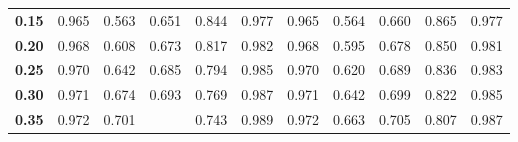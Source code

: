 \begin{table}
\begin{small}
\begin{tabular}{l|l|l|l|l|l|l|l|l|l|l}
    \cellcolor[HTML]{EFEFEF}\textbf{0.15}   & \cellcolor[HTML]{FFEEEE}0.965                 & \cellcolor[HTML]{FFEEEE}0.563               & \cellcolor[HTML]{FFEEEE}0.651                     & \cellcolor[HTML]{FFEEEE}0.844                    & \cellcolor[HTML]{FFEEEE}0.977                 & \cellcolor[HTML]{EEFFEE}0.965                 & \cellcolor[HTML]{EEFFEE}0.564               & \cellcolor[HTML]{EEFFEE}0.660                    & \cellcolor[HTML]{EEFFEE}0.865                    & \cellcolor[HTML]{EEFFEE}0.977                       \\ \cline{1-11} 
    \cellcolor[HTML]{EFEFEF}\textbf{0.20}   & \cellcolor[HTML]{FFEEEE}0.968                 & \cellcolor[HTML]{FFEEEE}0.608               & \cellcolor[HTML]{FFEEEE}0.673                     & \cellcolor[HTML]{FFEEEE}0.817                    & \cellcolor[HTML]{FFEEEE}0.982                 & \cellcolor[HTML]{EEFFEE}0.968                 & \cellcolor[HTML]{EEFFEE}0.595               & \cellcolor[HTML]{EEFFEE}0.678                    & \cellcolor[HTML]{EEFFEE}0.850                    & \cellcolor[HTML]{EEFFEE}0.981                       \\ \cline{1-11}
    \cellcolor[HTML]{EFEFEF}\textbf{0.25}   & \cellcolor[HTML]{FFEEEE}0.970                 & \cellcolor[HTML]{FFEEEE}0.642               & \cellcolor[HTML]{FFEEEE}0.685                     & \cellcolor[HTML]{FFEEEE}0.794                    & \cellcolor[HTML]{FFEEEE}0.985                 & \cellcolor[HTML]{EEFFEE}0.970                 & \cellcolor[HTML]{EEFFEE}0.620               & \cellcolor[HTML]{EEFFEE}0.689                    & \cellcolor[HTML]{EEFFEE}0.836                    & \cellcolor[HTML]{EEFFEE}0.983                       \\ \cline{1-11}
    \cellcolor[HTML]{EFEFEF}\textbf{0.30}   & \cellcolor[HTML]{FFEEEE}0.971                 & \cellcolor[HTML]{FFEEEE}0.674               & \cellcolor[HTML]{FFEEEE}0.693                     & \cellcolor[HTML]{FFEEEE}0.769                    & \cellcolor[HTML]{FFEEEE}0.987                 & \cellcolor[HTML]{EEFFEE}0.971                 & \cellcolor[HTML]{EEFFEE}0.642               & \cellcolor[HTML]{EEFFEE}0.699                    & \cellcolor[HTML]{EEFFEE}0.822                    & \cellcolor[HTML]{EEFFEE}0.985                       \\ \cline{1-11}
    \cellcolor[HTML]{D8D8D8}\textbf{0.35}   & \cellcolor[HTML]{FFEEEE}0.972                 & \cellcolor[HTML]{FFEEEE}0.701               & \cellcolor[HTML]{FFDDDD}{\textbf{0.697}}          & \cellcolor[HTML]{FFEEEE}0.743                    & \cellcolor[HTML]{FFEEEE}0.989                 & \cellcolor[HTML]{EEFFEE}0.972                 & \cellcolor[HTML]{EEFFEE}0.663               & \cellcolor[HTML]{EEFFEE}0.705                    & \cellcolor[HTML]{EEFFEE}0.807                    & \cellcolor[HTML]{EEFFEE}0.987                       \\ \cline{1-11} 

\end{tabular}
\end{small}
\end{table}
